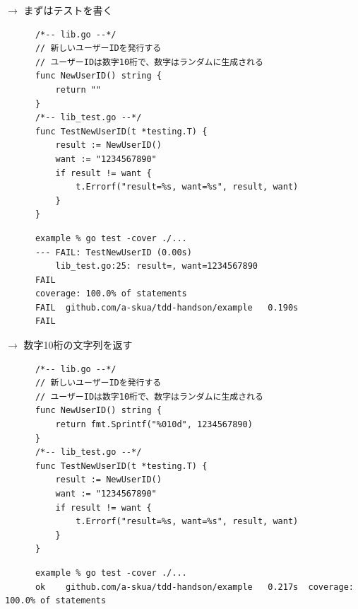 \documentclass[aspectratio=169]{beamer}
\begin{document}
\begin{frame}[fragile]
  $\rightarrow$ まずはテストを書く
  {
    \scriptsize
    \begin{verbatim}
      /*-- lib.go --*/
      // 新しいユーザーIDを発行する
      // ユーザーIDは数字10桁で、数字はランダムに生成される
      func NewUserID() string {
          return ""
      }
      /*-- lib_test.go --*/
      func TestNewUserID(t *testing.T) {
          result := NewUserID()
          want := "1234567890"
          if result != want {
              t.Errorf("result=%s, want=%s", result, want)
          }
      }
    \end{verbatim}
  }
  {
    \color{gray}
    \scriptsize
    \begin{verbatim}
      example % go test -cover ./...   
      --- FAIL: TestNewUserID (0.00s)
          lib_test.go:25: result=, want=1234567890
      FAIL
      coverage: 100.0% of statements
      FAIL	github.com/a-skua/tdd-handson/example	0.190s
      FAIL
    \end{verbatim}
  }
\end{frame}

\begin{frame}[fragile]
  $\rightarrow$ 数字10桁の文字列を返す
  {
    \scriptsize
    \begin{verbatim}
      /*-- lib.go --*/
      // 新しいユーザーIDを発行する
      // ユーザーIDは数字10桁で、数字はランダムに生成される
      func NewUserID() string {
          return fmt.Sprintf("%010d", 1234567890)
      }
      /*-- lib_test.go --*/
      func TestNewUserID(t *testing.T) {
          result := NewUserID()
          want := "1234567890"
          if result != want {
              t.Errorf("result=%s, want=%s", result, want)
          }
      }
    \end{verbatim}
  }
  {
    \color{gray}
    \scriptsize
    \begin{verbatim}
      example % go test -cover ./...
      ok  	github.com/a-skua/tdd-handson/example	0.217s	coverage: 100.0% of statements
    \end{verbatim}
  }
\end{frame}
\end{document}
